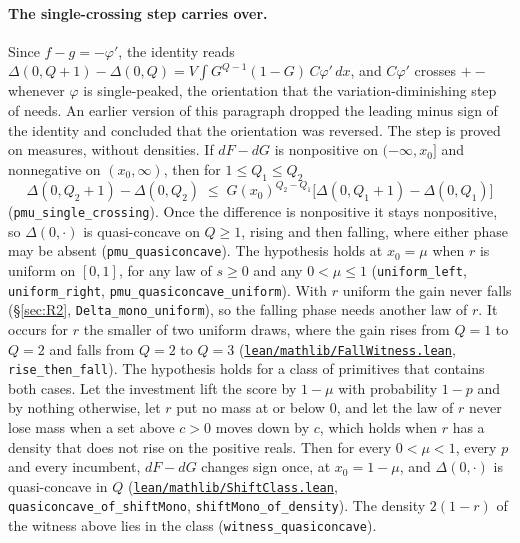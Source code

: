 \documentclass[11pt]{article}
\newcommand{\file}[1]{\href{run:#1}{\texttt{#1}}}
\begin{document}
\paragraph{The single-crossing step carries over.} Since $f-g=-\varphi'$, the
identity reads $\Delta(0,Q{+}1)-\Delta(0,Q)=V\int G^{Q-1}(1-G)\,C\varphi'\,dx$,
and $C\varphi'$ crosses $+-$ whenever $\varphi$ is single-peaked, the
orientation that the variation-diminishing step of
\citet{RyvkinDrugov2020} needs. An earlier version of this paragraph dropped
the leading minus sign of the identity and concluded that the orientation was
reversed. The step is proved on measures, without densities. If $dF-dG$ is
nonpositive on $(-\infty,x_0]$ and nonnegative on $(x_0,\infty)$, then for
$1\le Q_1\le Q_2$
\[
  \Delta(0,Q_2{+}1)-\Delta(0,Q_2) \;\le\; G(x_0)^{Q_2-Q_1}
  \big[\Delta(0,Q_1{+}1)-\Delta(0,Q_1)\big]
\]
(\texttt{pmu\_single\_crossing}). Once the difference is nonpositive it stays
nonpositive, so $\Delta(0,\cdot)$ is quasi-concave on $Q\ge1$, rising and then
falling, where either phase may be absent (\texttt{pmu\_quasiconcave}). The
hypothesis holds at $x_0=\mu$ when $r$ is uniform on $[0,1]$, for any law of
$s\ge0$ and any $0<\mu\le1$ (\texttt{uniform\_left}, \texttt{uniform\_right},
\texttt{pmu\_quasiconcave\_uniform}). With $r$ uniform the gain never falls
(\S\ref{sec:R2}, \texttt{Delta\_mono\_uniform}), so the falling phase needs
another law of $r$. It occurs for $r$ the smaller of two uniform draws, where
the gain rises from $Q=1$ to $Q=2$ and falls from $Q=2$ to $Q=3$
(\file{lean/mathlib/FallWitness.lean}, \texttt{rise\_then\_fall}). The
hypothesis holds for a class of primitives that contains both cases. Let the
investment lift the score by $1-\mu$ with probability $1-p$ and by nothing
otherwise, let $r$ put no mass at or below $0$, and let the law of $r$ never
lose mass when a set above $c>0$ moves down by $c$, which holds when $r$ has a
density that does not rise on the positive reals. Then for every $0<\mu<1$,
every $p$ and every incumbent, $dF-dG$ changes sign once, at $x_0=1-\mu$, and
$\Delta(0,\cdot)$ is quasi-concave in $Q$
(\file{lean/mathlib/ShiftClass.lean}, \texttt{quasiconcave\_of\_shiftMono},
\texttt{shiftMono\_of\_density}). The density $2(1-r)$ of the witness above lies
in the class (\texttt{witness\_quasiconcave}).
\end{document}
